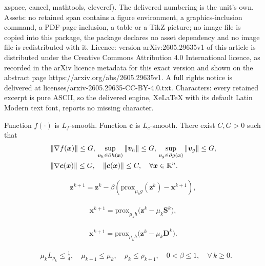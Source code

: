 \documentclass[10pt,a4paper]{amsart}
\newcommand{\RR}{\mathbb{R}}
\newcommand{\bD}{\bm{D}}
\newcommand{\bS}{\bm{S}}
\newcommand{\bc}{\bm{c}}
\newcommand{\bv}{\bm{v}}
\newcommand{\bx}{\bm{x}}
\newcommand{\bz}{\bm{z}}
\newcommand{\prox}{\mathrm{prox}}
\begin{document}
xspace, cancel, mathtools, cleveref). The delivered numbering is the unit's own. Assets: no retained span contains a figure environment, a graphics-inclusion command, a PDF-page inclusion, a table or a TikZ picture; no image file is copied into this package, the package declares no asset dependency and no image file is redistributed with it. Licence: version arXiv:2605.29635v1 of this article is distributed under the Creative Commons Attribution 4.0 International licence, as recorded in the arXiv licence metadata for this exact version and shown on the abstract page https://arxiv.org/abs/2605.29635v1. A full rights notice is delivered at licenses/arxiv-2605.29635-CC-BY-4.0.txt. Characters: every retained excerpt is pure ASCII, so the delivered engine, XeLaTeX with its default Latin Modern text font, reports no missing character.
\begin{assumption}
    \label{Ass: boundedness of c and f} Function $f(\cdot)$ is
    $L_f$-smooth. Function \(\bc\) is \(L_c\)-smooth. There exist $C, G>0$ such that
    \begin{align}
         &\|\nabla f(\bx) \| \leq G,\,
         \sup_{\bv_h\in\partial h(\bx)}\|\bv_h\| \leq G,\,
         \sup_{\bv_g\in\partial g(\bx)}\|\bv_g\| \leq G,\\ \notag
         &\|\nabla \bc(\bx) \| \leq G,\quad
         \| \bc(\bx) \| \leq C,\quad \forall \bx\in\RR^n.\notag
    \end{align}
\end{assumption}

\begin{align} 
\label{eq:bz_update}
\bz^{k+1} = \bz^k - \beta \left( \prox_{\mu_k g}(\bz^k) - \bx^{k+1} \right),
\end{align}

\begin{align}
\bx^{k+1} = 
\prox_{\mu_k h}\bigl(\bz^k - \mu_k \bS^{k}\bigr), \label{eq:bx_update_Polyak}
\end{align}

\begin{align}
\label{eq:bx_update_storm}
    \bx^{k+1} 
    = \prox_{\mu_k h}\bigl(\bz^k - \mu_k \bD^{k}\bigr).
\end{align}

\begin{align}
    \label{Eq: basic parameter conditions for both algorithms}
    &\mu_{k}L_{\rho_k} \leq \frac{1}{4}, \quad
    \mu_{k+1} \leq \mu_{k}, \quad
    \rho_{k} \leq \rho_{k+1}, \quad
    0 < \beta \leq 1, \quad \forall\, k \geq 0.
\end{align}
\end{document}
